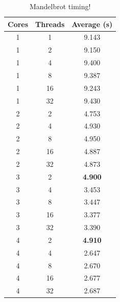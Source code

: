 \documentclass[bsc,frontabs,twoside,singlespacing,parskip,deptreport]{infthesis}     %
\begin{document}
\begin{table}[h]\centering
\caption{Mandelbrot timing!}\label{timing-infos-mb}
\scriptsize
\begin{tabular}{ccc}\toprule
Cores &Threads &Average (s) \\
\midrule
1 &1 &9.143 \\
\midrule
1 &2 &9.150 \\
1 &4 &9.400 \\
1 &8 &9.387 \\
1 &16 &9.243 \\
1 &32 &9.430 \\
\midrule
2 &2 &4.753 \\
2 &4 &4.930 \\
2 &8 &4.950 \\
2 &16 &4.887 \\
2 &32 &4.873 \\
\midrule
3 &2 &\textbf{4.900} \\
3 &4 &3.453 \\
3 &8 &3.447 \\
3 &16 &3.377 \\
3 &32 &3.390 \\
\midrule
4 &2 &\textbf{4.910} \\
4 &4 &2.647 \\
4 &8 &2.670 \\
4 &16 &2.677 \\
4 &32 &2.687 \\
\bottomrule
\end{tabular}
\end{table}

\end{document}
